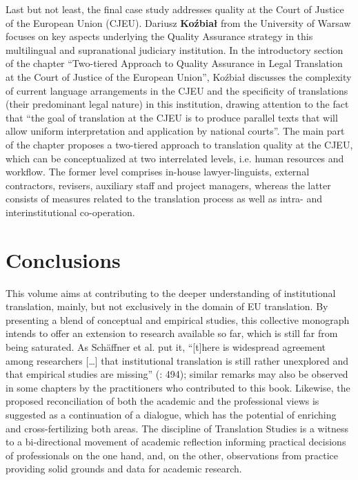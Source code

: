 \documentclass[output=paper]{langsci/langscibook}
\begin{document}
Last but not least, the final case study addresses quality at the Court of Justice of the European Union (CJEU). Dariusz \textbf{Koźbiał} from the University of Warsaw focuses on key aspects underlying the Quality Assurance strategy in this multilingual and supranational judiciary institution. In the introductory section of the chapter “Two-tiered Approach to Quality Assurance in Legal Translation at the Court of Justice of the European Union”, Koźbiał discusses the complexity of current language arrangements in the CJEU and the specificity of translations (their predominant legal nature) in this institution, drawing attention to the fact that “the goal of translation at the CJEU is to produce parallel texts that will allow uniform interpretation and application by national courts”. The main part of the chapter proposes a two-tiered approach to translation quality at the CJEU, which can be conceptualized at two interrelated levels, i.e. human resources and workflow. The former level comprises in-house lawyer-linguists, external contractors, revisers, auxiliary staff and project managers, whereas the latter consists of measures related to the translation process as well as intra- and interinstitutional co-operation.

\section{Conclusions}

This volume aims at contributing to the deeper understanding of institutional translation, mainly, but not exclusively in the domain of EU translation. By presenting a blend of conceptual and empirical studies, this collective monograph intends to offer an extension to research available so far, which is still far from being saturated. As Schäffner et al. put it, “[t]here is widespread agreement among researchers […] that institutional translation is still rather unexplored and that empirical studies are missing” (\citeyear{SchäffnerEtAl2014}: 494); similar remarks may also be observed in some chapters by the practitioners who contributed to this book. Likewise, the proposed reconciliation of both the academic and the professional views is suggested as a continuation of a dialogue, which has the potential of enriching and cross-fertilizing both areas. The discipline of Translation Studies is a witness to a bi-directional movement of academic reflection informing practical decisions of professionals on the one hand, and, on the other, observations from practice providing solid grounds and data for academic research.
\end{document}
